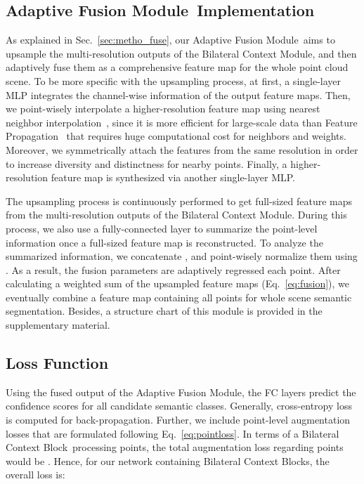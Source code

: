 \documentclass[10pt,twocolumn,letterpaper]{article}
\def\ourencoder{Bilateral Context Module}
\def\ourblock{Bilateral Context Block}
\def\ourblocks{Bilateral Context Blocks}
\def\ourdecoder{Adaptive Fusion Module}
\begin{document}
\subsection{\ourdecoder~Implementation}
\label{sec:impl_decoder}
As explained in Sec.~\ref{sec:metho_fuse}, our \ourdecoder~aims to upsample the multi-resolution outputs of the \ourencoder, and then adaptively fuse them as a comprehensive feature map for the whole point cloud scene. To be more specific with the upsampling process, at first, a single-layer MLP integrates the channel-wise information of the output feature maps. Then, we point-wisely interpolate a higher-resolution feature map using nearest neighbor interpolation~\cite{keys1981cubic}, since it is more efficient for large-scale data than Feature Propagation~\cite{qi2017pointnet++} that requires huge computational cost for neighbors and weights. Moreover, we symmetrically attach the features from the same resolution in order to increase diversity and distinctness for nearby points. Finally, a higher-resolution feature map is synthesized via another single-layer MLP.

The upsampling process is continuously performed to get full-sized feature maps  from the multi-resolution outputs of the \ourencoder. During this process, we also use a fully-connected layer to summarize the point-level information  once a full-sized feature map  is reconstructed. To analyze the summarized information, we concatenate , and point-wisely normalize them using . As a result, the fusion parameters  are adaptively regressed \wrt each point. After calculating a weighted sum of the upsampled feature maps (Eq.~\ref{eq:fusion}), we eventually combine a feature map containing all points for whole scene semantic segmentation. Besides, a structure chart of this module is provided in the supplementary material.

\subsection{Loss Function}
Using the fused output of the \ourdecoder, the FC layers predict the confidence scores for all candidate semantic classes. Generally, cross-entropy loss  is computed for back-propagation. Further, we include point-level augmentation losses  that are formulated following Eq.~\ref{eq:pointloss}. In terms of a \ourblock~processing  points, the total augmentation loss regarding  points would be . Hence, for our network containing  \ourblocks, the overall loss is:
\end{document}
